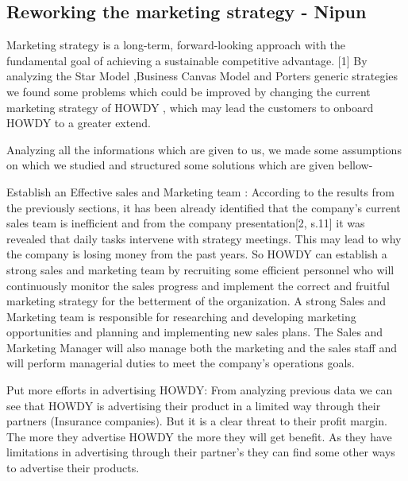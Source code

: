 
\subsection{Reworking the marketing strategy - Nipun}

Marketing strategy is a long-term, forward-looking approach with the fundamental goal of achieving a sustainable competitive advantage. [1] By analyzing the Star Model ,Business Canvas Model and Porters generic strategies we found some problems which could be improved by changing the current marketing strategy of HOWDY , which may lead the customers to onboard HOWDY to a greater extend.

Analyzing all the informations which are given to us, we made some assumptions on which we studied and structured some solutions which are given bellow-

Establish an Effective sales and Marketing team : According to the results from the previously sections, it has been already identified that the company’s current sales team is inefficient and from the company presentation[2, s.11] it was revealed that daily tasks intervene with strategy meetings. This may lead to why the company is losing money from the past years. So HOWDY can establish a strong sales and marketing team by recruiting some efficient personnel who will continuously monitor the sales progress and implement the correct and fruitful marketing strategy for the betterment of the organization. A strong Sales and Marketing team is responsible for researching and developing marketing opportunities and planning and implementing new sales plans. The Sales and Marketing Manager will also manage both the marketing and the sales staff and will perform managerial duties to meet the company's operations goals.

Put more efforts in advertising HOWDY: From analyzing previous data we can see that HOWDY is advertising their product in a limited way through their partners (Insurance companies). But it is a clear threat to their profit margin. The more they advertise HOWDY the more they will get benefit. As they have limitations in advertising through their partner’s they can find some other ways to advertise their products.

